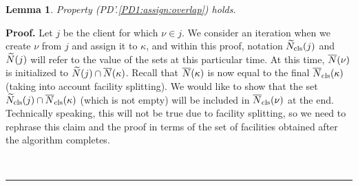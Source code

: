 \documentclass[oneside,final]{ucr}
\newtheorem{lemma}[theorem]{Lemma}
\newenvironment{proof}[1][Proof]{\textbf{#1.} }{\ \rule{0.5em}{0.5em}}
\def\ssp{\def\baselinestretch{1.0}\large\normalsize}
\begin{document}

\begin{lemma} \label{lem: PD1: primary overlap}
  Property (PD'.\ref{PD1:assign:overlap}) holds.
\end{lemma}
\begin{proof}
  Let $j$ be the client for which $\nu\in j$. We consider an iteration
  when we create $\nu$ from $j$ and assign it to $\kappa$, and
  within this proof, notation ${\widetilde N}_{{\mbox{\scriptsize\rm cls}}}(j)$ and ${\widetilde N}(j)$
  will refer to the value of the sets at this particular time.  
At this time, ${\overline{N}}(\nu)$ is initialized to ${\widetilde N}(j)\cap
  {\overline{N}}(\kappa)$.  Recall that ${\overline{N}}(\kappa)$ is now equal to the
  final ${\overline{N}}_{{\mbox{\scriptsize\rm cls}}}(\kappa)$ (taking into account facility splitting). We
  would like to show that the set ${\widetilde N}_{{\mbox{\scriptsize\rm cls}}}(j)\cap
  {\overline{N}}_{{\mbox{\scriptsize\rm cls}}}(\kappa)$ (which is not empty) will be included in
  ${\overline{N}}_{{\mbox{\scriptsize\rm cls}}}(\nu)$ at the end. Technically speaking, this will not be
  true due to facility splitting, so we need to rephrase this claim
  and the proof in terms of the set of facilities obtained after the
  algorithm completes.

\ssp
\begin{figure}[ht]
\begin{center}
\end{center}
\end{figure}
\end{proof}
\end{document}
